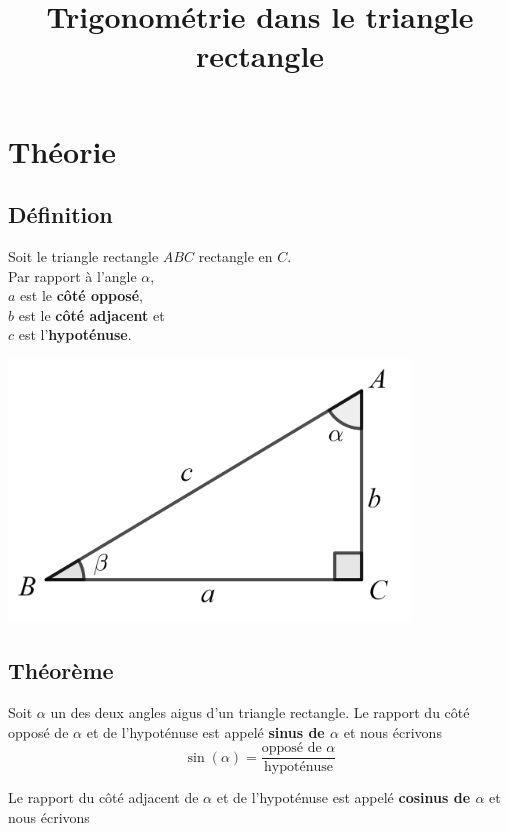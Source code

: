 \documentclass[a4paper,11pt]{article}
\begin{document}
\title{Trigonométrie dans le triangle rectangle}
\date{}
\maketitle

\section{Théorie}
\subsection{Définition}
\begin{multicols}{2}
Soit le triangle rectangle $ABC$ rectangle en $C$.\\
Par rapport à l'angle $\alpha$,\\
$a$ est le \textbf{côté opposé},\\
$b$ est le \textbf{côté adjacent} et \\
$c$ est l'\textbf{hypoténuse}.\\
\begin{center}
\includegraphics[width=0.8\textwidth]{images/trianglerect.png}\\
\end{center}
\end{multicols}

\subsection{Théorème}
Soit $\alpha$ un des deux angles aigus d'un triangle rectangle. Le rapport du côté opposé de $\alpha$ et de l'hypoténuse est appelé \textbf{sinus de $\alpha$} et nous écrivons
$$\sin(\alpha)=\frac{\text{opposé de }\alpha}{\text{hypoténuse}}$$

Le rapport du côté adjacent de $\alpha$ et de l'hypoténuse est appelé \textbf{cosinus de $\alpha$} et nous écrivons
\end{document}
